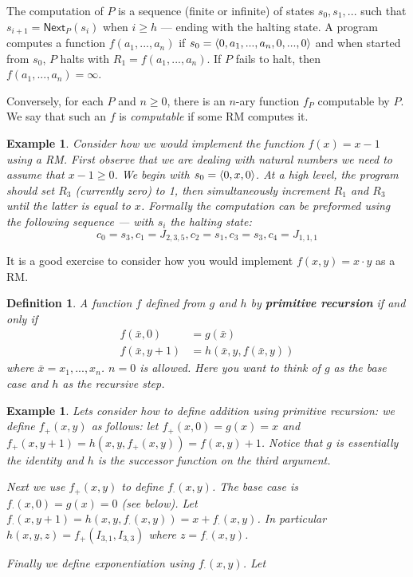 \documentclass[twoside]{article}
\newtheorem{definition}[theorem]{Definition}
\newtheorem{example}[theorem]{Example}
\def\Next{\mathsf{Next}}
\DeclarePairedDelimiter\anglebrac{\langle}{\rangle}
\begin{document}
The computation of $P$ is a sequence (finite or infinite) of states $s_0, s_1, ...$ such that $s_{i+1} = \Next_P(s_i)$ when $i \geq h$ --- ending with the halting state. A program computes a function $f(a_1, ..., a_n)$ if $s_0 = \anglebrac{0, a_1, ..., a_n, 0,...,0}$ and when started from $s_0$, $P$ halts with $R_1 = f(a_1, ..., a_n)$. If $P$ fails to halt, then $f(a_1, ..., a_n) = \infty$.

Conversely, for each $P$ and $n \geq 0$, there is an $n$-ary function $f_P$ computable by $P$. We say that such an $f$ is \emph{computable} if some RM computes it.

\begin{example}
Consider how we would implement the function $f(x) = x-1$ using a RM. First observe that we are dealing with natural numbers we need to assume that $x-1 \geq 0$. We begin with $s_0 = \anglebrac{0, x, 0}$. At a high level, the program should set $R_3$ (currently zero) to 1, then simultaneously increment $R_1$ and $R_3$ until the latter is equal to $x$. Formally the computation can be preformed using the following sequence --- with $s_i$ the halting state:
\[c_0 = s_3, c_1 = J_{2,3,5}, c_2 = s_1, c_3 = s_3, c_4 = J_{1,1,1}\]       
\end{example}

It is a good exercise to consider how you would implement $f(x,y) = x\cdot y$ as a RM.


\begin{definition}
A function $f$ defined from $g$ and $h$ by \textbf{primitive recursion} if and only if
\begin{align*}
f(\bar{x}, 0) &= g(\bar{x}) \\
f(\bar{x}, y+1) &= h(\bar{x}, y, f(\bar{x}, y))
\end{align*}
where $\bar{x} = x_1, ..., x_n$. $n = 0$ is allowed. Here you want to think of $g$ as the base case and $h$ as the recursive step.
\end{definition}

\begin{example}
Lets consider how to define addition using primitive recursion: we define  $f_{+}(x,y)$ as follows: let $f_{+}(x,0) = g(x) = x$ and $f_{+}(x, y+1) = h(x, y, f_{+}(x,y)) = f(x,y) + 1$. Notice that $g$ is essentially the identity and $h$ is the successor function on the third argument.

Next we use $f_{+}(x,y)$ to define $f_{\cdot}(x,y)$. The base case is $f_{\cdot}(x,0) = g(x) = 0$ (see below). Let $f_{\cdot}(x,y+1) = h(x,y,f_{\cdot}(x,y)) = x + f_{\cdot}(x,y)$. In particular $h(x,y,z) = f_{+}(I_{3,1}, I_{3,3})$ where $z = f_{\cdot}(x,y)$. 

Finally we define exponentiation using $f_{\cdot}(x,y)$. Let
\end{example}
\end{document}
